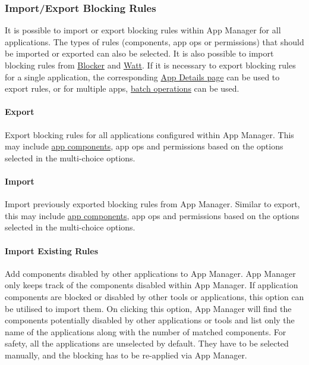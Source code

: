 
\subsubsection{Import/Export Blocking Rules} %
It is possible to import or export blocking rules within App Manager for all applications. The types of rules (components, app ops or permissions) that should be imported or exported can also be selected.
It is also possible to import blocking rules from \href{https://github.com/lihenggui/blocker}{Blocker} and \href{https://github.com/tuyafeng/Watt}{Watt}.
If it is necessary to export blocking rules for a single application, the corresponding \hyperref[sec:app-details-page]{App Details page} can be used to export rules, or for multiple apps, \hyperref[subsec:batch-operations]{batch operations} can be used.


\paragraph{Export} Export blocking rules for all applications configured within App Manager.
This may include \hyperref[subsec:faq:what-are-app-components]{app components}, app ops and permissions based on the options selected in the multi-choice options.

\paragraph{Import} Import previously exported blocking rules from App Manager.
Similar to export, this may include \hyperref[subsec:faq:what-are-app-components]{app components}, app ops and permissions based on the options selected in the multi-choice options.

\paragraph{Import Existing Rules}\label{par:import-existing-rules}
Add components disabled by other applications to App Manager. App Manager only keeps track of the components disabled within App Manager.
If application components are blocked or disabled by other tools or applications, this option can be utilised to import them.
On clicking this option, App Manager will find the components potentially disabled by other applications or tools and list only the name of the applications along with the number of matched components.
For safety, all the applications are unselected by default. They have to be selected manually, and the blocking has to be re-applied via App Manager.


